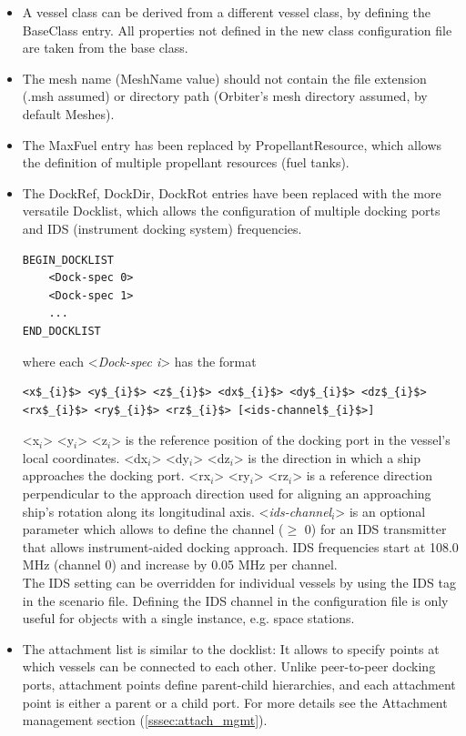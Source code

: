 \documentclass[Orbiter Developer Manual.tex]{subfiles}
\begin{document}
\begin{itemize}
\item A vessel class can be derived from a different vessel class, by defining the BaseClass entry. All properties not defined in the new class configuration file are taken from the base class.
\item The mesh name (MeshName value) should not contain the file extension (.msh assumed) or directory path (Orbiter's mesh directory assumed, by default Meshes).
\item The MaxFuel entry has been replaced by PropellantResource, which allows the definition of multiple propellant resources (fuel tanks).
\item The DockRef, DockDir, DockRot entries have been replaced with the more versatile Docklist, which allows the configuration of multiple docking ports and IDS (instrument docking system) frequencies.

\begin{lstlisting}[language=OSFS]
BEGIN_DOCKLIST
	<Dock-spec 0>
	<Dock-spec 1>
	...
END_DOCKLIST
\end{lstlisting}

\noindent
where each <\textit{Dock-spec i}> has the format

\begin{lstlisting}[language=OSFS,mathescape=true]
<x$_{i}$> <y$_{i}$> <z$_{i}$> <dx$_{i}$> <dy$_{i}$> <dz$_{i}$> <rx$_{i}$> <ry$_{i}$> <rz$_{i}$> [<ids-channel$_{i}$>]
\end{lstlisting}

\noindent
<x$_{i}$> <y$_{i}$> <z$_{i}$> is the reference position of the docking port in the vessel's local coordinates. <dx$_{i}$> <dy$_{i}$> <dz$_{i}$> is the direction in which a ship approaches the docking port. <rx$_{i}$> <ry$_{i}$> <rz$_{i}$> is a reference direction perpendicular to the approach direction used for aligning an approaching ship's rotation along its longitudinal axis. <\textit{ids-channel}$_{i}$> is an optional parameter which allows to define the channel ($\geq$ 0) for an IDS transmitter that allows instrument-aided docking approach. IDS frequencies start at 108.0 MHz (channel 0) and increase by 0.05 MHz per channel.\\
The IDS setting can be overridden for individual vessels by using the IDS tag in the scenario file. Defining the IDS channel in the configuration file is only useful for objects with a single instance, e.g. space stations.

\item The attachment list is similar to the docklist: It allows to specify points at which vessels can be connected to each other. Unlike peer-to-peer docking ports, attachment points define parent-child hierarchies, and each attachment point is either a parent or a child port. For more details see the Attachment management section (\ref{sssec:attach_mgmt}).


\end{itemize}
\end{document}
